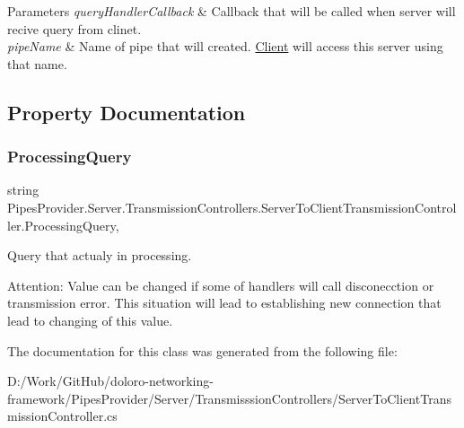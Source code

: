 \begin{DoxyParams}{Parameters}
{\em query\+Handler\+Callback} & Callback that will be called when server will recive query from clinet.\\
\hline
{\em pipe\+Name} & Name of pipe that will created. \mbox{\hyperlink{namespace_pipes_provider_1_1_client}{Client}} will access this server using that name.\\
\hline
\end{DoxyParams}


\subsection{Property Documentation}
\mbox{\label{class_pipes_provider_1_1_server_1_1_transmission_controllers_1_1_server_to_client_transmission_controller_abc1b9e3483f9e0f1fd83e72d9b87377d}} 
\subsubsection{\texorpdfstring{Processing\+Query}{ProcessingQuery}}
{\footnotesize\ttfamily string Pipes\+Provider.\+Server.\+Transmission\+Controllers.\+Server\+To\+Client\+Transmission\+Controller.\+Processing\+Query\hspace{0.3cm}{\ttfamily [get]}, {\ttfamily [set]}}



Query that actualy in processing. 

Attention\+: Value can be changed if some of handlers will call disconecction or transmission error. This situation will lead to establishing new connection that lead to changing of this value. 

The documentation for this class was generated from the following file\+:\begin{DoxyCompactItemize}
\item 
D\+:/\+Work/\+Git\+Hub/doloro-\/networking-\/framework/\+Pipes\+Provider/\+Server/\+Transmisssion\+Controllers/Server\+To\+Client\+Transmission\+Controller.\+cs\end{DoxyCompactItemize}
